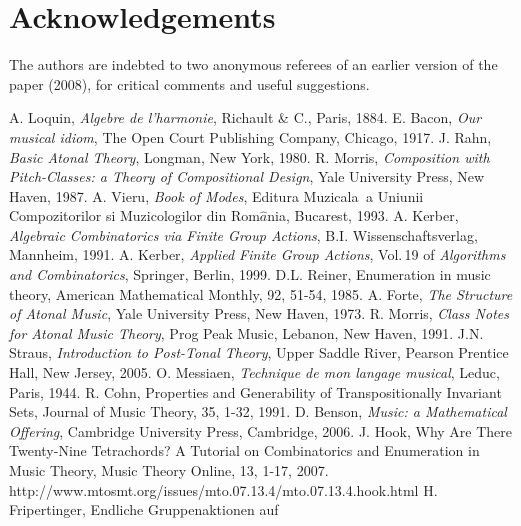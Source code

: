 \documentclass[12pt,a4paper]{article}
\begin{document}
\section*{Acknowledgements}
The authors are indebted to two anonymous referees of an earlier version of
the paper (2008), for critical comments and useful suggestions.

\begin{thebibliography}{}
 A. Loquin, {\it Algebre de l'harmonie}, Richault \& C., Paris,
                1884. 
 E. Bacon, {\it Our musical idiom}, The Open Court Publishing
                Company, Chicago, 1917.
 J. Rahn, {\it Basic Atonal Theory}, Longman, New York, 1980.
 R. Morris, {\it Composition with Pitch-Classes: a Theory of
                Compositional Design}, Yale University Press, New Haven, 1987.
 A. Vieru, {\it Book of Modes},  Editura Muzicala$^{~}$ a
                Uniunii
                Compozitorilor si Muzicologilor din Rom$\hat{a}$nia, Bucarest,
                1993.
 A. Kerber, {\it Algebraic Combinatorics via Finite Group
                Actions}, B.I. Wissenschaftsverlag, Mannheim, 1991.
 A. Kerber, {\it Applied Finite Group Actions}, Vol.\,19 of
                {\it Algorithms and Combinatorics}, Springer, Berlin, 1999.
 D.L. Reiner, Enumeration in music theory, American
                Mathematical Monthly, 92, 51-54, 1985.
 A. Forte, {\it The Structure of Atonal Music}, Yale University
                Press, New Haven, 1973.
 R. Morris, {\it Class Notes for Atonal Music Theory}, Prog
                Peak Music, Lebanon, New Haven, 1991.
 J.N. Straus, {\it Introduction to Post-Tonal Theory}, Upper
                Saddle River, Pearson Prentice Hall, New Jersey, 2005.
 O. Messiaen, {\it Technique de mon langage musical}, Leduc,
                Paris, 1944.
 R. Cohn, Properties and Generability of Transpositionally
                Invariant Sets, Journal of Music Theory, 35, 1-32, 1991.
 D. Benson, {\it Music: a Mathematical Offering}, Cambridge
                University Press, Cambridge, 2006.
 J. Hook, Why Are There Twenty-Nine Tetrachords? A Tutorial on  
                Combinatorics and Enumeration in Music Theory, Music Theory
                Online, 13, 1-17, 2007.
                http://www.mtosmt.org/issues/mto.07.13.4/mto.07.13.4.hook.html
 H. Fripertinger, Endliche Gruppenaktionen auf

\end{thebibliography}
\end{document}
